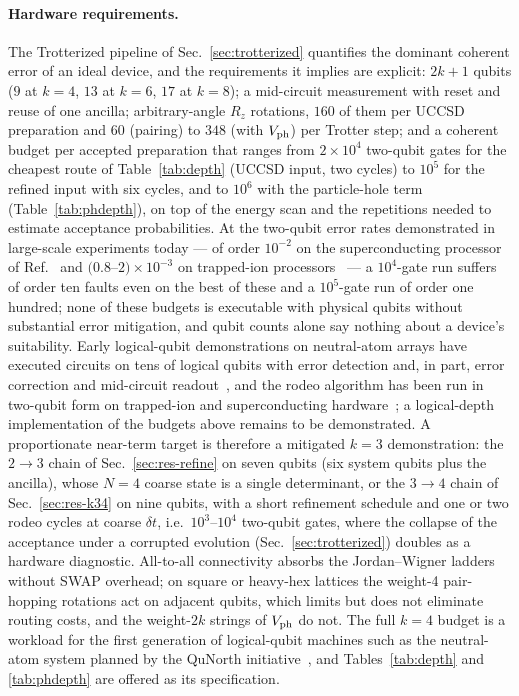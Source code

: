 \documentclass[
  aps,            %
  prc,            %
  reprint,        %
  superscriptaddress,
  floatfix,
  nofootinbib
]{revtex4-2}
\begin{document}
\paragraph{Hardware requirements.}
The Trotterized pipeline of Sec.~\ref{sec:trotterized} quantifies the dominant
coherent error of an ideal device, and the requirements it implies are
explicit: $2k+1$ qubits ($9$ at $k=4$, $13$ at $k=6$, $17$ at $k=8$); a
mid-circuit measurement with reset and reuse of one ancilla; arbitrary-angle
$R_z$ rotations, $160$ of them per UCCSD preparation and $60$ (pairing) to
$348$ (with $V_{\rm ph}$) per Trotter step; and a coherent budget per accepted
preparation that ranges from $2\times10^{4}$ two-qubit gates for the cheapest
route of Table~\ref{tab:depth} (UCCSD input, two cycles) to $10^{5}$ for the
refined input with six cycles, and to $10^{6}$ with the particle-hole term
(Table~\ref{tab:phdepth}), on top of the energy scan and the repetitions
needed to estimate acceptance probabilities.  At the two-qubit error rates
demonstrated in large-scale experiments today --- of order $10^{-2}$ on the
superconducting processor of Ref.~\cite{Kim2023} and $(0.8$--$2)\times10^{-3}$
on trapped-ion processors~\cite{Moses2023,Ransford2025} --- a $10^{4}$-gate
run suffers of order ten faults even on the best of these and a
$10^{5}$-gate run of order one hundred; none of these
budgets is executable with physical qubits without substantial error
mitigation, and qubit counts alone say nothing about a device's suitability.
Early logical-qubit demonstrations on neutral-atom arrays have executed
circuits on tens of logical qubits with error detection and, in part, error
correction and mid-circuit readout~\cite{Bluvstein2024,Reichardt2024}, and the
rodeo algorithm has been run in two-qubit form on trapped-ion and
superconducting hardware~\cite{BeeLindgren2022,Qian2024}; a logical-depth
implementation of the budgets above remains to be demonstrated.  A
proportionate near-term target is therefore a mitigated $k=3$ demonstration:
the $2\to3$ chain of Sec.~\ref{sec:res-refine} on seven qubits (six system
qubits plus the ancilla), whose $N=4$ coarse state is a single determinant, or
the $3\to4$ chain of Sec.~\ref{sec:res-k34} on nine qubits, with a short
refinement schedule and one or two rodeo cycles at coarse $\delta t$, i.e.\
$10^{3}$--$10^{4}$ two-qubit gates, where the collapse of the acceptance under
a corrupted evolution (Sec.~\ref{sec:trotterized}) doubles as a hardware
diagnostic.  All-to-all connectivity absorbs the Jordan--Wigner ladders
without SWAP overhead; on square or heavy-hex lattices the weight-4
pair-hopping rotations act on adjacent qubits, which limits but does not
eliminate routing costs, and the weight-$2k$ strings of $V_{\rm ph}$ do not.
The full $k=4$ budget is a workload for the first generation of logical-qubit
machines such as the neutral-atom system planned by the QuNorth
initiative~\cite{QuNorth}, and Tables~\ref{tab:depth} and \ref{tab:phdepth}
are offered as its specification.
\end{document}
